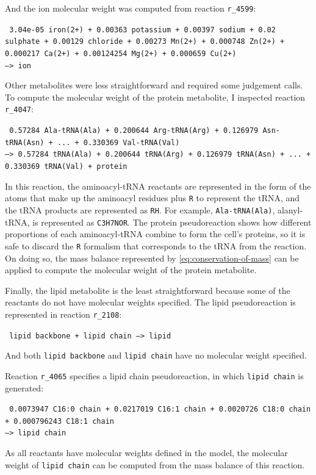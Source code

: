 And the ion molecular weight was computed from reaction \texttt{r\_4599}:

\texttt{
    3.04e-05 iron(2+) + 0.00363 potassium + 0.00397 sodium + 0.02 sulphate + 0.00129 chloride + 0.00273 Mn(2+) + 0.000748 Zn(2+) + 0.000217 Ca(2+) + 0.00124254 Mg(2+) + 0.000659 Cu(2+)
    \\ --> ion
}

Other metabolites were less straightforward and required some judgement calls.
To compute the molecular weight of the protein metabolite, I inspected reaction \texttt{r\_4047}:

\texttt{
  0.57284 Ala-tRNA(Ala) + 0.200644 Arg-tRNA(Arg) + 0.126979 Asn-tRNA(Asn) + ... + 0.330369 Val-tRNA(Val)
  \\ --> 0.57284 tRNA(Ala) + 0.200644 tRNA(Arg) + 0.126979 tRNA(Asn) + ... + 0.330369 tRNA(Val) + protein
}

In this reaction, the aminoacyl-tRNA reactants are represented in the form of the atoms that make up the aminoacyl residues plus \texttt{R} to represent the tRNA, and the tRNA products are represented as \texttt{RH}.
For example, \texttt{Ala-tRNA(Ala)}, alanyl-tRNA, is represented as \texttt{C3H7NOR}.
The protein pseudoreaction shows how different proportions of each aminoacyl-tRNA combine to form the cell's proteins, so it is safe to discard the \texttt{R} formalism that corresponds to the tRNA from the reaction.
On doing so, the mass balance represented by \ref{eq:conservation-of-mass} can be applied to compute the molecular weight of the protein metabolite.

Finally, the lipid metabolite is the least straightforward because some of the reactants do not have molecular weights specified.
The lipid pseudoreaction is represented in reaction \texttt{r\_2108}:

\texttt{
  lipid backbone + lipid chain --> lipid
}

And both \texttt{lipid backbone} and \texttt{lipid chain} have no molecular weight specified.

Reaction \texttt{r\_4065} specifies a lipid chain pseudoreaction, in which \texttt{lipid chain} is generated:

\texttt{
  0.0073947 C16:0 chain + 0.0217019 C16:1 chain + 0.0020726 C18:0 chain + 0.000796243 C18:1 chain
  \\ --> lipid chain
}

As all reactants have molecular weights defined in the model, the molecular weight of \texttt{lipid chain} can be computed from the mass balance of this reaction.

